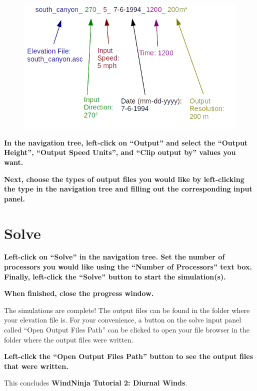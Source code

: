\documentclass[12pt]{article}
\begin{document}
\begin{figure}[H]
	\centering
	\label{}
	\includegraphics[scale=1.0]{imgs/colored_file_info_1.png}
\end{figure}

\textbf{\color{red}In the navigation tree, left-click on “Output” and select the “Output Height”, “Output Speed Units”, and  “Clip output by” values you want.}

\textbf{\color{red} Next, choose the types of output files you would like by left-clicking the type in the navigation tree and filling out the corresponding input panel.}

\section{Solve}

\textbf{\color{red} Left-click on “Solve” in the navigation tree.  Set the number of processors you would like using the “Number of Processors” text box.  Finally, left-click the “Solve” button to start the simulation(s).}

\textbf{\color{red} When finished, close the progress window.}

The simulations are complete!  The output files can be found in the folder where your elevation file is.  For your convenience, a button on the solve input panel called “Open Output Files Path” can be clicked to open your file browser in the folder where the output files were written.

\textbf{\color{red}  Left-click the “Open Output Files Path” button to see the output files that were written.}

This concludes \textbf{WindNinja Tutorial 2: Diurnal Winds}.
\end{document}
